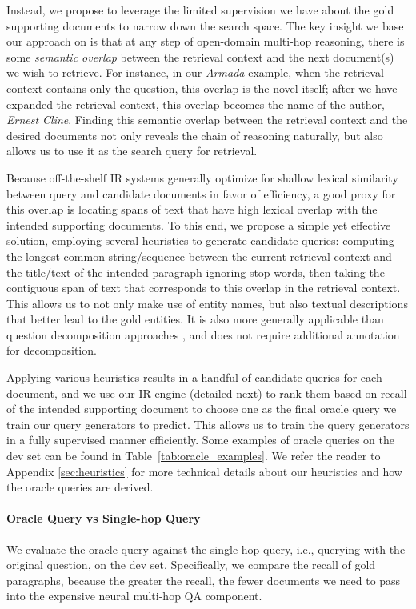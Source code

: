 Instead, we propose to leverage the limited supervision we have about the gold supporting documents  to narrow down the search space.
The key insight we base our approach on is that at any step of open-domain multi-hop reasoning, there is some \emph{semantic overlap} between the retrieval context and the next document(s) we wish to retrieve.
For instance, in our \emph{Armada} example, when the retrieval context contains only the question, this overlap is the novel itself; after we have expanded the retrieval context, this overlap becomes the name of the author, \emph{Ernest Cline}.
Finding this semantic overlap between the retrieval context and the desired documents not only reveals the chain of reasoning naturally, but also allows us to use it as the search query for retrieval.

Because off-the-shelf IR systems generally optimize for shallow lexical similarity between query and candidate documents in favor of efficiency,
a good proxy for this overlap is locating spans of text that have high lexical overlap with the intended supporting documents.
To this end, we propose a simple yet effective solution, employing several heuristics to generate candidate queries: computing the longest common string/sequence between the current retrieval context and the title/text of the intended paragraph ignoring stop words, then taking the contiguous span of text that corresponds to this overlap in the retrieval context.
This allows us to not only make use of entity names, but also textual descriptions that better lead to the gold entities.
It is also more generally applicable than question decomposition approaches \cite{talmor2018web,min2019multi}, and does not require additional annotation for decomposition.

Applying various heuristics results in a handful of candidate queries for each document, and we use our IR engine (detailed next) to rank them based on recall of the intended supporting document to choose one as the final oracle query we train our query generators to predict.
This allows us to train the query generators in a fully supervised manner efficiently.
Some examples of oracle queries on the \hotpotqa{} dev set can be found in Table~\ref{tab:oracle_examples}.
We refer the reader to Appendix \ref{sec:heuristics} for more technical details about our heuristics and how the oracle queries are derived.

\paragraph{Oracle Query vs Single-hop Query}
We evaluate the oracle query against the single-hop query, i.e., querying with the original question, on the \hotpotqa{} dev set.
Specifically, we compare the recall of gold paragraphs, because the greater the recall, the fewer documents we need to pass into the expensive neural multi-hop QA component.

